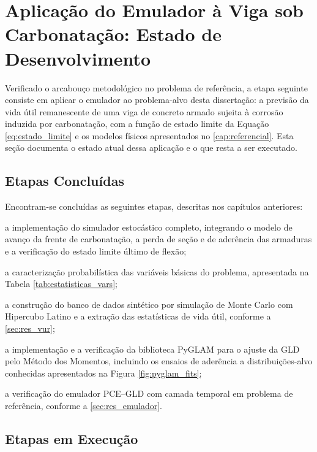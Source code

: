 \section{Aplicação do Emulador à Viga sob Carbonatação: Estado de Desenvolvimento} \label{sec:res_emulador_viga}

Verificado o arcabouço metodológico no problema de referência, a etapa seguinte consiste em aplicar o emulador ao problema-alvo desta dissertação: a previsão da vida útil remanescente de uma viga de concreto armado sujeita à corrosão induzida por carbonatação, com a função de estado limite da Equação \eqref{eq:estado_limite} e os modelos físicos apresentados no \autoref{cap:referencial}. Esta seção documenta o estado atual dessa aplicação e o que resta a ser executado.

\subsection{Etapas Concluídas}

Encontram-se concluídas as seguintes etapas, descritas nos capítulos anteriores:

\begin{alineas}
    \item a implementação do simulador estocástico completo, integrando o modelo de avanço da frente de carbonatação, a perda de seção e de aderência das armaduras e a verificação do estado limite último de flexão;
    \item a caracterização probabilística das variáveis básicas do problema, apresentada na Tabela \ref{tab:estatisticas_vars};
    \item a construção do banco de dados sintético por simulação de Monte Carlo com Hipercubo Latino e a extração das estatísticas de vida útil, conforme a \autoref{sec:res_vur};
    \item a implementação e a verificação da biblioteca PyGLAM para o ajuste da GLD pelo Método dos Momentos, incluindo os ensaios de aderência a distribuições-alvo conhecidas apresentados na Figura \ref{fig:pyglam_fits};
    \item a verificação do emulador PCE--GLD com camada temporal em problema de referência, conforme a \autoref{sec:res_emulador}.
\end{alineas}

\subsection{Etapas em Execução}

